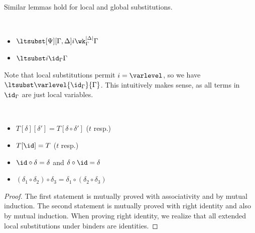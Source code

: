 Similar lemmas hold for local and global substitutions.
\begin{lemma} $ $
  \begin{itemize}
  \item $\ltsubst[\Psi][\Gamma,\Delta]i{\wk_{\Gamma}^{|\Delta|}}{\Gamma}$
  \item $\ltsubst i{\id_{\Gamma}}{\Gamma}$
  \end{itemize}
\end{lemma}
Note that local substitutions permit $i = \varlevel$, so we have $\ltsubst
\varlevel{\id_{\Gamma}}{\Gamma}$. %
This intuitively makes sense, as all terms in $\id_{\Gamma}$ are just local variables. 
\begin{lemma} $ $
  \begin{itemize}
  \item $T[\delta][\delta'] = T[\delta \circ \delta']$ ($t$ resp.)
  \item $T[\id] = T$ ($t$ resp.)
  \item $\id \circ \delta = \delta$ and $\delta \circ \id = \delta$
  \item $(\delta_1 \circ \delta_2) \circ \delta_3 = \delta_1 \circ (\delta_2 \circ \delta_3)$
  \end{itemize}
\end{lemma}
\begin{proof}
  The first statement is mutually proved with associativity and by mutual
  induction. The second statement is mutually proved with right identity and also by
  mutual induction. %
  When proving right identity, we realize that all extended local substitutions under
  binders are identities.
\end{proof}

